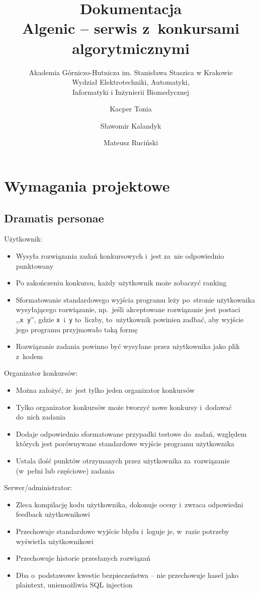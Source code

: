 \documentclass{article}
\title{Dokumentacja \\ Algenic -- serwis z~konkursami algorytmicznymi}
\subtitle{Akademia Górniczo-Hutnicza im. Stanisława Staszica w Krakowie\\
	Wydział Elektrotechniki, Automatyki,\\
	Informatyki i Inżynierii Biomedycznej}
\author{Kacper Tonia\and
		Sławomir Kalandyk\and
		Mateusz Ruciński}
\date{}
\begin{document}
\maketitle

\section{Wymagania projektowe}

\subsection{Dramatis personae}

Użytkownik:
\begin{itemize}
	\item Wysyła rozwiązania zadań konkursowych i~jest za~nie odpowiednio punktowany
	\item Po zakończeniu konkursu, każdy użytkownik może zobaczyć ranking
	\item Sformatowanie standardowego wyjścia programu leży po~stronie użytkownika wysyłającego rozwiązanie, np.~jeśli akceptowane rozwiązanie jest postaci ,,\texttt{x~y}'', gdzie \texttt{x}~i~\texttt{y} to~liczby, to~użytkownik powinien zadbać, aby wyjście jego programu przyjmowało taką formę
	\item Rozwiązanie zadania powinno być wysyłane przez użytkownika jako plik z~kodem
\end{itemize}

Organizator konkursów:
\begin{itemize}
	\item Można założyć, że~jest tylko jeden organizator konkursów
	\item Tylko organizator konkursów może tworzyć nowe konkursy i~dodawać do~nich zadania
	\item Dodaje odpowiednio sformatowane przypadki testowe do~zadań, względem których jest porównywane standardowe wyjście programu użytkownika
	\item Ustala ilość punktów otrzymanych przez użytkownika za~rozwiązanie (w~pełni lub częściowe) zadania
\end{itemize}

Serwer/administrator:
\begin{itemize}
	\item Zleca kompilację kodu użytkownika, dokonuje oceny i~zwraca odpowiedni feedback użytkownikowi
	\item Przechowuje standardowe wyjście błędu i~loguje je, w~razie potrzeby wyświetla użytkownikowi
	\item Przechowuje historie przesłanych rozwiązań
	\item Dba o~podstawowe kwestie bezpieczeństwa -- nie przechowuje haseł jako plaintext, uniemożliwia SQL injection
\end{itemize}
\end{document}
